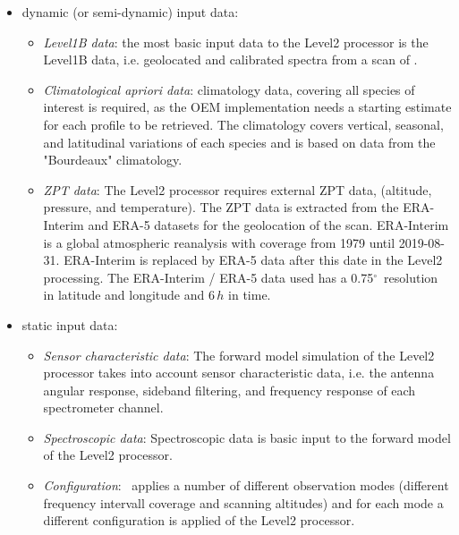 \begin{itemize}
  \item dynamic (or semi-dynamic) input data:
  \begin{itemize}

    \item \emph{Level1B data}: the most basic input data to the 
    Level2 processor is the Level1B data, i.e. geolocated and 
    calibrated spectra from a scan of \smr.
    
    \item \emph{Climatological \textit{apriori} data}:
    climatology data, covering all species of interest is required, as
    the OEM implementation needs a starting estimate for each profile
    to be retrieved. The climatology covers vertical, seasonal,
    and latitudinal variations of each species and is based on data
    from the "Bourdeaux" climatology.

    \item \emph{ZPT data}:
    The Level2 processor requires external ZPT data,
    (altitude, pressure, and temperature).
    The ZPT data is extracted from the ERA-Interim and ERA-5 datasets for the geolocation
    of the scan.   
    ERA-Interim is a global atmospheric reanalysis with coverage from 1979
    until 2019-08-31. ERA-Interim is replaced by ERA-5 data after this date
    in the Level2 processing. The ERA-Interim / ERA-5 data used
    has a 0.75\(^\circ\)\ resolution in latitude and longitude and 6\,\(h\)
    in time.
    
   

  \end{itemize}
  \item static input data:
  \begin{itemize}
    \item \emph{Sensor characteristic data}:
    The forward model simulation of the Level2 processor takes into account
    sensor characteristic data, i.e. the antenna angular response,
    sideband filtering, and frequency response of each spectrometer channel.

    \item \emph{Spectroscopic data}:
    Spectroscopic data is basic input to the forward model of the Level2
    processor.

    \item \emph{Configuration}:
    \smr\ applies a number of different observation modes
    (different frequency intervall coverage and scanning altitudes) 
    and for each mode a different configuration is applied
    of the Level2 processor.
  \end{itemize}
\end{itemize}


